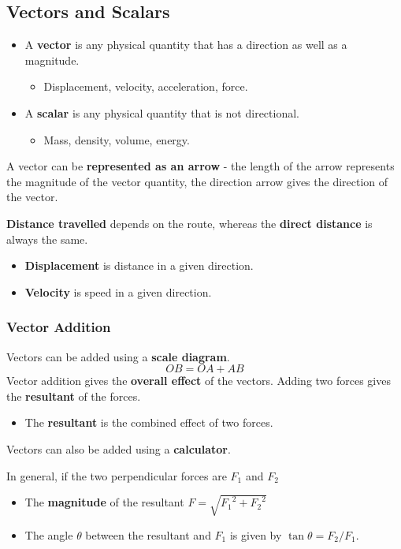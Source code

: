 \subsection{Vectors and Scalars}

\begin{itemize}
    \item A \textbf{vector} is any physical quantity that has a direction as well as a magnitude.
        \begin{itemize}
            \item Displacement, velocity, acceleration, force.
        \end{itemize}
    \item A \textbf{scalar} is any physical quantity that is not directional.
        \begin{itemize}
            \item Mass, density, volume, energy.
        \end{itemize}
\end{itemize}
A vector can be \textbf{represented as an arrow} - the length of the arrow represents the magnitude of the vector quantity, the direction arrow gives the direction of the vector.

\textbf{Distance travelled} depends on the route, whereas the \textbf{direct distance} is always the same.
\begin{itemize}
    \item \textbf{Displacement} is distance in a given direction.
    \item \textbf{Velocity} is speed in a given direction.
\end{itemize}

\subsubsection*{Vector Addition}

Vectors can be added using a \textbf{scale diagram}.
$$OB=OA+AB$$
Vector addition gives the \textbf{overall effect} of the vectors. Adding two forces gives the \textbf{resultant} of the forces.
\begin{itemize}
    \item The \textbf{resultant} is the combined effect of two forces.
\end{itemize}

Vectors can also be added using a \textbf{calculator}.

In general, if the two perpendicular forces are $F_1$ and $F_2$
\begin{itemize}
    \item The \textbf{magnitude} of the resultant $F=\sqrt{{F_1}^2+{F_2}^2}$
    \item The angle $\theta$ between the resultant and $F_1$ is given by $\tan\theta=F_2/F_1$.
\end{itemize}

